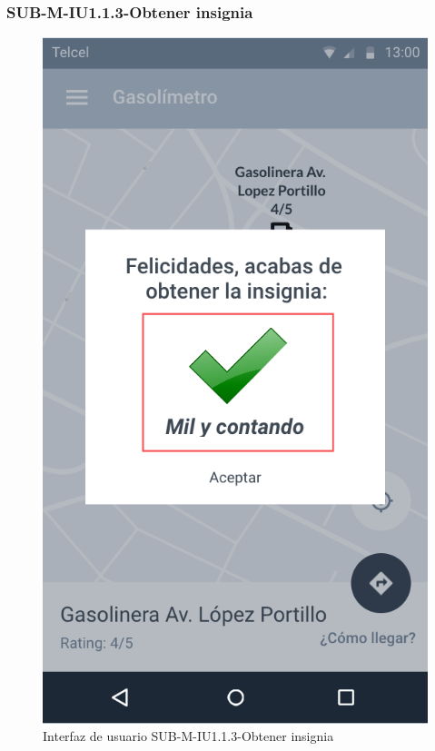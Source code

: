 \subsubsection{SUB-M-IU1.1.3-Obtener insignia}\label{SUB-M-IU1.1.3}
\begin{figure}[H]
	\centering
	\includegraphics[scale=.55]{Capitulo4/software/submodulos/mediciones/images/sub-m-iu1_1_3}
	\caption{Interfaz de usuario SUB-M-IU1.1.3-Obtener insignia}
	\label{fig:sub-m-iu1.1.3}
\end{figure}